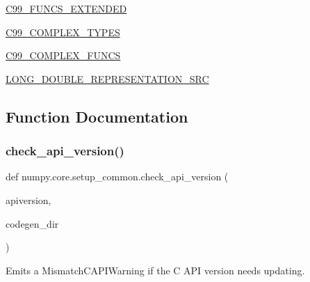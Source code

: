 \begin{DoxyCompactItemize}
\item 
\hyperlink{namespacenumpy_1_1core_1_1setup__common_a6a26d5e65bcc2485ad9a3598eca26b95}{C99\+\_\+\+F\+U\+N\+C\+S\+\_\+\+E\+X\+T\+E\+N\+D\+ED}
\item 
\hyperlink{namespacenumpy_1_1core_1_1setup__common_a2bd1b1df0a1cfdf0069f3ac464ed1112}{C99\+\_\+\+C\+O\+M\+P\+L\+E\+X\+\_\+\+T\+Y\+P\+ES}
\item 
\hyperlink{namespacenumpy_1_1core_1_1setup__common_a9ee8651600584fe92dc9699257b12601}{C99\+\_\+\+C\+O\+M\+P\+L\+E\+X\+\_\+\+F\+U\+N\+CS}
\item 
\hyperlink{namespacenumpy_1_1core_1_1setup__common_a037d9cc8a6dd56b3bc6ab0b2bdf237ea}{L\+O\+N\+G\+\_\+\+D\+O\+U\+B\+L\+E\+\_\+\+R\+E\+P\+R\+E\+S\+E\+N\+T\+A\+T\+I\+O\+N\+\_\+\+S\+RC}
\end{DoxyCompactItemize}


\subsection{Function Documentation}
\mbox{\label{namespacenumpy_1_1core_1_1setup__common_a0b24934d705a2aa548781667aeab61b5}} 
\subsubsection{\texorpdfstring{check\+\_\+api\+\_\+version()}{check\_api\_version()}}
{\footnotesize\ttfamily def numpy.\+core.\+setup\+\_\+common.\+check\+\_\+api\+\_\+version (\begin{DoxyParamCaption}\item[{}]{apiversion,  }\item[{}]{codegen\+\_\+dir }\end{DoxyParamCaption})}

\begin{DoxyVerb}Emits a MismatchCAPIWarning if the C API version needs updating.\end{DoxyVerb}
 \mbox{\label{namespacenumpy_1_1core_1_1setup__common_a64da3d0d4bc2f8f616a7d51f0d788f3c}} 
